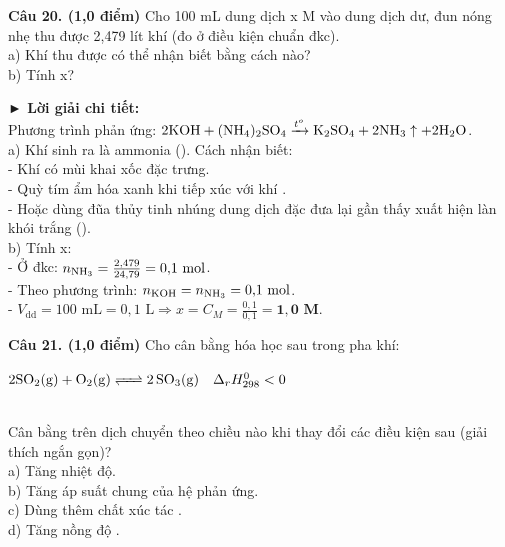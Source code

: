 \documentclass[11pt,a4paper]{article}
\begin{document}
\vspace{6pt}
\noindent\textbf{Câu 20. (1,0 điểm)} Cho 100 mL dung dịch  x M vào dung dịch  dư, đun nóng nhẹ thu được 2,479 lít khí (đo ở điều kiện chuẩn đkc).\\
a) Khí thu được có thể nhận biết bằng cách nào?\\
b) Tính x?

\begin{tcolorbox}[colback=white,colframe=solBlue,arc=1mm,boxrule=0.5pt,top=2mm,bottom=2mm,left=3mm,right=3mm]
{\color{solBlue}\textbf{► Lời giải chi tiết:}}\\
Phương trình phản ứng: $2\ce{KOH} + \ce{(NH4)2SO4} \xrightarrow{t^o} \ce{K2SO4} + 2\ce{NH3}\uparrow + 2\ce{H2O}$.\\
a) Khí sinh ra là ammonia (). Cách nhận biết:\\
- Khí có mùi khai xốc đặc trưng.\\
- Quỳ tím ẩm hóa xanh khi tiếp xúc với khí .\\
- Hoặc dùng đũa thủy tinh nhúng dung dịch  đặc đưa lại gần thấy xuất hiện làn khói trắng ().\\
b) Tính x:\\
- Ở đkc: $n_{\ce{NH3}} = \frac{2{,}479}{24{,}79} = 0{,}1\text{ mol}$.\\
- Theo phương trình: $n_{\ce{KOH}} = n_{\ce{NH3}} = 0{,}1\text{ mol}$.\\
- $V_{\text{dd}} = 100\text{ mL} = 0{,}1\text{ L} \Rightarrow x = C_M = \frac{0{,}1}{0{,}1} = \mathbf{1{,}0\text{ M}}$.
\end{tcolorbox}

\vspace{6pt}
\noindent\textbf{Câu 21. (1,0 điểm)} Cho cân bằng hóa học sau trong pha khí:\\
\centerline{$2\ce{SO2(g) + O2(g) <=> 2SO3(g)} \quad \Delta_r H^0_{298} < 0$}\\
Cân bằng trên dịch chuyển theo chiều nào khi thay đổi các điều kiện sau (giải thích ngắn gọn)?\\
a) Tăng nhiệt độ.\\
b) Tăng áp suất chung của hệ phản ứng.\\
c) Dùng thêm chất xúc tác .\\
d) Tăng nồng độ .
\end{document}
